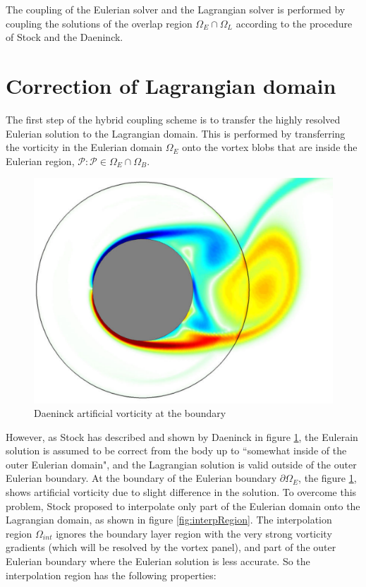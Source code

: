 The coupling of the Eulerian solver and the Lagrangian solver is performed by coupling the solutions of the overlap region $\Omega_E \cap \Omega_L$ according to the procedure of Stock and the Daeninck.

\section{Correction of Lagrangian domain}

The first step of the hybrid coupling scheme is to transfer the highly resolved Eulerian solution to the Lagrangian domain. This is performed by transferring the vorticity in the Eulerian domain $\Omega_E$ onto the vortex blobs that are inside the Eulerian region, $\mathcal{P}: \mathcal{P} \in \Omega_E \cap \Omega_B$.

	\begin{figure}[h]
	\centering
	\includegraphics[width=0.5\linewidth]{./figures/hybrid/daeninck_CylinderVorticity.png}
	\caption{Daeninck artificial vorticity at the boundary}
	\label{fig:daeninck_CylinderVorticity}
	\end{figure}
								
However, as Stock has described \cite{} and shown by Daeninck in figure \ref{fig:daeninck_CylinderVorticity}, the Eulerain solution is assumed to be correct from the body up to ``somewhat inside of the outer Eulerian domain", and the Lagrangian solution is valid outside of the outer Eulerian boundary. At the boundary of the Eulerian boundary $\partial \Omega_E$, the figure \ref{}, shows artificial vorticity due to slight difference in the solution. To overcome this problem, Stock proposed to interpolate only part of the Eulerian domain onto the Lagrangian domain, as shown in figure \ref{fig:interpRegion}. The interpolation region $\Omega_{int}$ ignores the boundary layer region with the very strong vorticity gradients (which will be resolved by the vortex panel), and part of the outer Eulerian boundary where the Eulerian solution is less accurate. So the interpolation region has the following properties:

